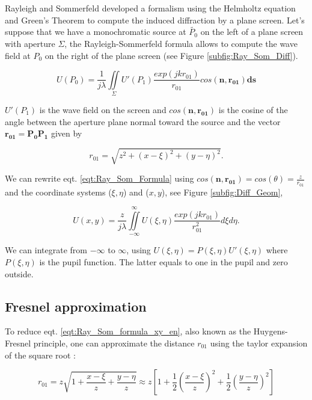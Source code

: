 Rayleigh and Sommerfeld developed a formalism using the Helmholtz equation and Green's Theorem to compute the induced diffraction by a plane screen. Let's suppose that we have a monochromatic source at $\widetilde{P_0}$ on the left of a plane screen with aperture $\Sigma$, the Rayleigh-Sommerfeld formula allows to compute the wave field at $P_0$ on the right of the plane screen (see Figure \ref{subfig:Ray_Som_Diff}).

\begin{equation}
U(P_0) = \frac{1}{j\lambda} \iint\limits_{\Sigma} U'(P_1)\frac{exp(jkr_{01})}{r_{01}}cos(\mathbf{n},\mathbf{r_{01}})\mathbf{ds}
\label{eqt:Ray_Som_Formula}
\end{equation}

$U'(P_1)$ is the wave field on the screen and $cos(\mathbf{n},\mathbf{r_{01}})$ is the cosine of the angle between the aperture plane normal toward the source and the vector $\mathbf{r_{01}} = \mathbf{P_0P_1}$ given by 

\begin{equation}
r_{01} = \sqrt{z^2 + (x-\xi)^2 + (y-\eta)^2}.
\label{eqt:r_01}
\end{equation}

We can rewrite eqt. \eqref{eqt:Ray_Som_Formula} using $cos(\mathbf{n},\mathbf{r_{01}}) = cos(\theta) = \frac{z}{r_{01}}$ and the coordinate systems ($\xi,\eta$) and ($x,y$), see Figure \ref{subfig:Diff_Geom},

\begin{equation}
U(x,y) = \frac{z}{j\lambda} \iint\limits_{-\infty}^{\infty} U(\xi,\eta)\frac{exp(jkr_{01})}{r_{01}^2} d\xi d\eta.
\label{eqt:Ray_Som_formula_xy_en}
\end{equation}

We can integrate from $-\infty$ to $\infty$, using $U(\xi,\eta) = P(\xi,\eta)U'(\xi,\eta)$ where $P(\xi,\eta)$ is the pupil function. The latter equals to one in the pupil and zero outside. 

\subsection{Fresnel approximation}
\label{subsec:FresnelApprox}

To reduce eqt. \eqref{eqt:Ray_Som_formula_xy_en}, also known as the Huygens-Fresnel principle, one can approximate the distance $r_{01}$ using the taylor expansion of the square root :

\begin{equation}
r_{01} = z \sqrt{1 + \frac{x-\xi}{z} + \frac{y-\eta}{z}} \approx z \left[1+\frac{1}{2}\left(\frac{x-\xi}{z}\right)^2+\frac{1}{2}\left(\frac{y-\eta}{z}\right)^2\right]
\label{eqt:approx_r01}
\end{equation}

